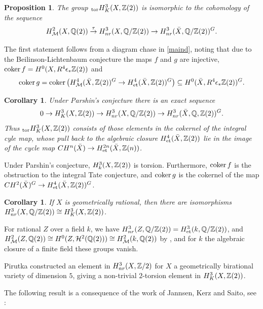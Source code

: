 \documentclass[nospthms,envcountsect]{svmult} %
\newtheorem{corollary}  [theorem]       {Corollary}
\newtheorem{proposition}[theorem]       {Proposition}
\begin{document}
\begin{proposition}
The group ${}_{\text{\rm tor}} H^3_K(X,{{\mathbb Z}}(2))$ is isomorphic to the cohomology 
of the sequence
$$ H^2_{\mathcal M}(X,{{\mathbb Q}}(2))\stackrel{\tau}{\to} 
H^3_{nr}(X,{{\mathbb Q}}/{{\mathbb Z}}(2))\to H^3_{nr}(\bar X,{{\mathbb Q}}/{{\mathbb Z}}(2))^G.$$
\end{proposition}

\proof
The first statement follows from a diagram chase in \eqref{maind},
noting that due to the Beilinson-Lichtenbaum conjecture 
the maps $f$ and $g$ are injective,
$\operatorname{coker} f=H^0(X,R^4\epsilon_*{{\mathbb Z}}(2))$
and 
$$\operatorname{coker} g= \operatorname{coker}\big( H^4_{\mathcal M}(\bar X,{{\mathbb Z}}(2))^G\to 
H^4_{\text{\rm et}}(\bar X,{{\mathbb Z}}(2))^G\big) \subseteq H^0(\bar X,R^4\epsilon_*{{\mathbb Z}}(2))^G.$$
\proofend


\begin{corollary}
Under Parshin's conjecture there is an exact sequence 
$$0\to H^3_K(X,{{\mathbb Z}}(2))\to H^3_{nr}(X,{{\mathbb Q}}/{{\mathbb Z}}(2))\to 
H^3_{nr}(\bar X,{{\mathbb Q}},{{\mathbb Z}}(2))^G .$$
Thus ${}_{\text{\rm tor}} H^3_K(X,{{\mathbb Z}}(2))$ consists of those elements
in the cokernel of the integral cyle map, whose pull back to 
the algebraic closure $H^4_{\text{\rm et}}(\bar X,{{\mathbb Z}}(2))$ lie in the image of
the cycle map $CH^n(\bar X)\to H^{2n}_{\text{\rm et}}(\bar X,{{\mathbb Z}}(n))$.
\end{corollary}

\proof
Under Parshin's conjecture, $H^3_k(X,{{\mathbb Z}}(2))$ is torsion. Furthermore, 
$\operatorname{coker} f$ is the obstruction to the integral
Tate conjecture, and $\operatorname{coker} g$ is the cokernel of the map
$CH^2(\bar X)^G\to H^4_{\text{\rm et}}(\bar X,{{\mathbb Z}}(2))^G$.
\proofend



\begin{corollary}
If $X$ is geometrically rational, then there are isomorphisms
$H^3_{nr}(X,{{\mathbb Q}}/{{\mathbb Z}}(2))\cong H^3_K(X,{{\mathbb Z}}(2))$.
\end{corollary}

\proof
For rational $Z$ over a field $k$, we have 
$H^3_{nr}(Z,{{\mathbb Q}}/{{\mathbb Z}}(2))=H^3_{\text{\rm et}}(k,{{\mathbb Q}}/{{\mathbb Z}}(2))$, and 
$H^2_{\mathcal M}(Z,{{\mathbb Q}}(2))\cong H^0(Z,{\mathcal H}^2({{\mathbb Q}}(2)))\cong H^2_{\mathcal M}(k,{{\mathbb Q}}(2)) $
by \cite[2.1.9]{cothe}, and for $k$ the algebraic closure of a finite
field these groups vanish.
\proofend
 

Pirutka \cite{pirutka} 
constructed an element in $H^3_{nr}(X,{{\mathbb Z}}/2)$ for $X$ a geometrically
birational variety of dimension $5$, giving a non-trivial
$2$-torsion element in $H^3_K(X,{{\mathbb Z}}(2))$.




The following result is a consequence of the work of 
Jannsen, Kerz and Saito, see \cite{ichkato}:
\end{document}
